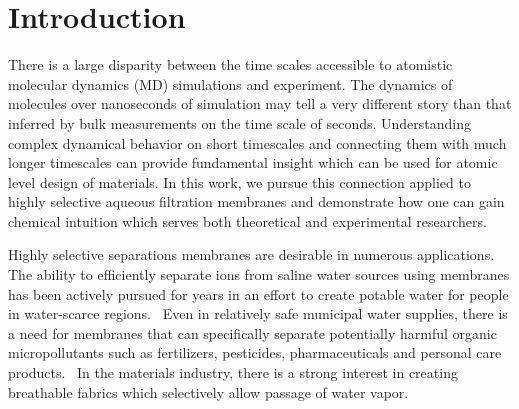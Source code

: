 \documentclass[journal=jctcce,manuscript=article]{achemso}
\begin{document}
  \maketitle
  
  \graphicspath{{./figures/}}

  \section{Introduction}


There is a large disparity between the time scales accessible to
atomistic molecular dynamics (MD) simulations and experiment. The
dynamics of molecules over nanoseconds of simulation may tell a very
different story than that inferred by bulk measurements on the time
scale of seconds. Understanding complex dynamical behavior on short
timescales and connecting them with much longer timescales can provide
fundamental insight which can be used for atomic level design of
materials. In this work, we pursue this connection applied to highly
selective aqueous filtration membranes and demonstrate how one can
gain chemical intuition which serves both theoretical and experimental
researchers.

  Highly selective separations membranes are desirable in numerous
  applications. The ability to efficiently separate ions from saline water
  sources using membranes has been actively pursued for years in an effort to
  create potable water for people in water-scarce
  regions.~\cite{werber_materials_2016} Even in relatively safe municipal water
  supplies, there is a need for membranes that can specifically separate
  potentially harmful organic micropollutants such as fertilizers, pesticides,
  pharmaceuticals and personal care products.~\cite{barbosa_occurrence_2016} In
  the materials industry, there is a strong interest in creating breathable
  fabrics which selectively allow passage of water
  vapor.~\cite{mondloch_destruction_2015}
\end{document}
